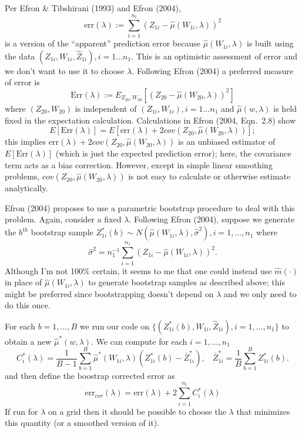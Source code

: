 \documentclass[12pt]{article}
\begin{document}
Per Efron \& Tibshirani (1993) and Efron (2004), 
\[
\mbox{err}(\lambda) := \sum_{i=1}^{n_1} ( Z_{1i} - \hat{\mu}(W_{1i},\lambda))^2
\]
is a version of the ``apparent'' prediction error because $\hat{\mu}(W_{1i},\lambda)$
is built using the data $(Z_{1i}, W_{1i}, \hat Z_{1i}), i = 1 \ldots n_1.$
This is an optimistic assessment of error and we don't want to use it to choose
$\lambda$.  Following Efron (2004) a preferred measure
of error is 
\[
\mbox{Err}(\lambda) := 
E_{Z_{20},W_{20}}\left[ (Z_{20} - \hat{\mu}(W_{20},\lambda))^2 \right]
\]
where $(Z_{20},W_{20})$ is independent of 
$(Z_{1i}, W_{1i}), i = 1 \ldots n_1$ and 
$\hat{\mu}(w,\lambda)$ is held fixed in the expectation
calculation.
Calculations in Efron (2004, Eqn.\ 2.8) show
\[
E[ \mbox{Err}(\lambda) ]
= E[ \mbox{err}(\lambda) + 2 cov(Z_{20},\hat{\mu}(W_{20},\lambda))];
\]
this implies $\mbox{err}(\lambda) + 2 cov(Z_{20},\hat{\mu}(W_{20},\lambda))$
is an unbiased estimator of $E[ \mbox{Err}(\lambda) ]$ (which is just the expected prediction error); here, the covariance term
acts as a bias correction. However,
except in simple linear smoothing problems, 
$cov(Z_{20},\hat{\mu}(W_{20},\lambda))$
is not easy to calculate or otherwise estimate analytically.

Efron (2004) proposes to use a parametric bootstrap procedure
to deal with this problem. Again, consider a fixed $\lambda$. 
Following Efron (2004), suppose we generate
the $b^{th}$ bootstrap sample
$Z_{1i}^*(b) \sim N( \hat \mu(W_{1i},\lambda), \hat \sigma^2 ), i = 1, \ldots, n_1$ 
where
\[
\hat \sigma^2 = n_1^{-1} \sum_{i=1}^{n_1} (Z_{1i}-\hat \mu(W_{1i},\lambda))^2.
\]
Although I'm not 100\% certain, it seems to me that one could instead use $\hat m(\cdot)$ in place of $\hat \mu(W_{1i},\lambda)$ to generate bootstrap samples as described above; this might be preferred since bootstrapping doesn't depend on $\lambda$ and we only need to do this once.

For each $b = 1,\ldots,B$ we run our code on $\{(Z^*_{1i}(b), W_{1i}, \hat Z_{1i}),
i=1,\ldots,n_1\}$ to obtain a new $\hat \mu^*(w,\lambda)$.  We can
compute for each $i=1,\ldots,n_1$
\[
C^*_i(\lambda) = \frac{1}{B-1} \sum_{b=1}^B \hat \mu^*(W_{1i},\lambda)
(Z^*_{1i}(b) - \bar Z^*_{1i}), 
~~~~\bar Z^*_{1i} = \frac{1}{B} \sum_{b=1}^B Z^*_{1i}(b).
\]
and then define the boostrap corrected error as
\[
\mbox{err}_{cor}(\lambda)  = \mbox{err}(\lambda) + 2 \sum_{i=1}^{n_1} C^*_i(\lambda)
\]
If run for $\lambda$ on a grid then it should be possible to choose 
the $\lambda$ that minimizes this quantity (or a smoothed version of it).
\end{document}

